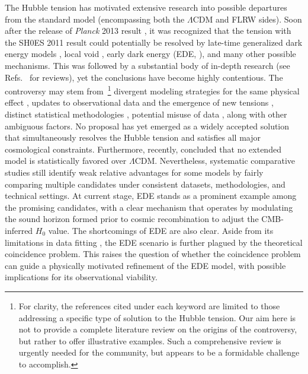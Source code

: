 \documentclass[aps,prd,twocolumn]{revtex4-2}
\begin{document}
The Hubble tension has motivated extensive research into possible departures from the standard model (encompassing both the $\Lambda$CDM and FLRW sides). Soon after the release of \textit{Planck} 2013 result \cite{Ade2014.AaA.571.A16}, it was recognized that the tension with the SH0ES 2011 result \cite{Riess2011.ApJ.730.119} could potentially be resolved by late-time generalized dark energy models \cite{Salvatelli2013.PRD.88.023531,Xia2013.PRD.88.063501}, local void \cite{Marra2013.PRL.110.241305,Keenan2013.ApJ.775.62}, early dark energy (EDE, \cite{Hojjati2013.PRL.111.041301}), and many other possible mechanisms. This was followed by a substantial body of in-depth research (see Refs.~\cite{Schoneberg2022.PhysRep.984.1,DiValentino2025.PhysDarkUniverse.49.101965} for reviews), yet the conclusions have become highly contentious. The controversy may stem from~\footnote{For clarity, the references cited under each keyword are limited to those addressing a specific type of solution to the Hubble tension. Our aim here is not to provide a complete literature review on the origins of the controversy, but rather to offer illustrative examples. Such a comprehensive review is urgently needed for the community, but appears to be a formidable challenge to accomplish.} divergent modeling strategies for the same physical effect \cite{BenDayan2014.PRL.112.221301,Odderskov2016.JCAP.02.001}, updates to observational data and the emergence of new tensions \cite{Poulin2019.PRL.122.221301,Hill2020.PRD.102.043507,Hill2022.PRD.105.123536,Smith2022.PRD.106.043526,Efstathiou2024.PRL.132.221002}, distinct statistical methodologies \cite{Zhao2017.NatAstron.1.627,Wang2018.ApJL.869.L8}, potential misuse of data \cite{Camarena2021.MNRAS.504.5164,Efstathiou2021.MNRAS.505.3866}, along with other ambiguous factors. No proposal has yet emerged as a widely accepted solution that simultaneously resolves the Hubble tension and satisfies all major cosmological constraints. Furthermore, recently, \citet{Calabrese2025.JCAP.11.063} concluded that no extended model is statistically favored over $\Lambda$CDM. Nevertheless, systematic comparative studies \cite{Knox2020.PRD.101.043533,Schoneberg2022.PhysRep.984.1,Khalife2024.JCAP.04.059} still identify weak relative advantages for some models by fairly comparing multiple candidates under consistent datasets, methodologies, and technical settings. At current stage, EDE stands as a prominent example among the promising candidates, with a clear mechanism that operates by modulating the sound horizon formed prior to cosmic recombination to adjust the CMB-inferred $H_0$ value. The shortcomings of EDE are also clear. Aside from its limitations in data fitting \cite{Hill2020.PRD.102.043507,Jedamzik2021.CommunPhys.4.123}, the EDE scenario is further plagued by the theoretical coincidence problem. This raises the question of whether the coincidence problem can guide a physically motivated refinement of the EDE model, with possible implications for its observational viability.
\end{document}
